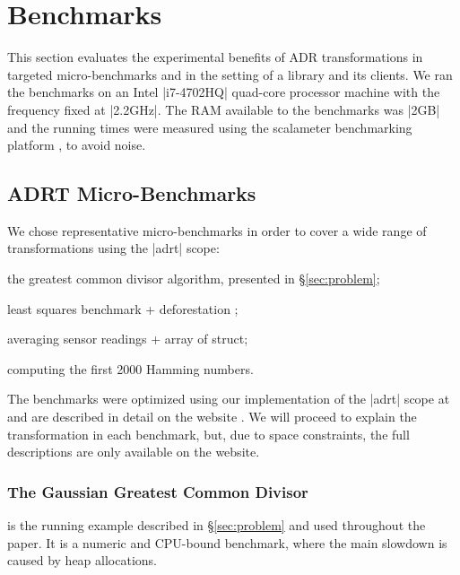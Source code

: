 \section{Benchmarks}
\label{sec:benchmarks}
\label{sec:benchmarks:ad-hoc}

This section evaluates the experimental benefits of ADR transformations in targeted micro-benchmarks and in
the setting of a library and its clients.
%
%
We ran the benchmarks on an Intel |i7-4702HQ| quad-core processor machine with the frequency fixed at |2.2GHz|. The RAM available to the benchmarks was |2GB| and the running times were measured using the scalameter benchmarking platform \cite{scalameter}, to avoid noise.


\subsection{ADRT Micro-Benchmarks}

We chose representative micro-benchmarks in order to cover a wide range of transformations using the |adrt| scope:

\begin{compactitem}
\item the greatest common divisor algorithm, presented in \S\ref{sec:problem};
\item least squares benchmark + deforestation \cite{wadler-deforestation};
\item averaging sensor readings + array of struct;
\item computing the first 2000 Hamming numbers.
\end{compactitem}

\noindent
The benchmarks were optimized using our implementation of the |adrt| scope at \cite{ildl-plugin} and are described in detail on the website \cite{ildl-plugin-wiki}. We will proceed to explain the transformation in each benchmark, but, due to space constraints, the full descriptions are only available on the website.

\subsubsection{The Gaussian Greatest Common Divisor}
is the running example described in \S\ref{sec:problem} and used throughout the paper. It is a numeric and CPU-bound benchmark, where the main slowdown is caused by heap allocations.

